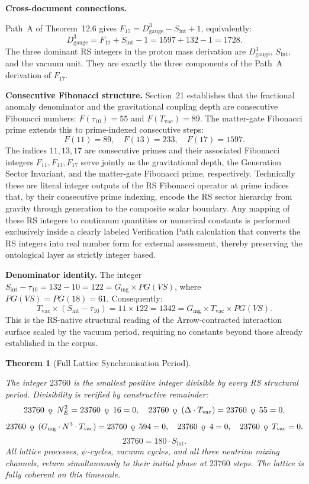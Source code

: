\documentclass[11pt, letterpaper]{article}
\newcommand{\koppa}{\mathbin{\text{\rm\k{o}}}}
\newcommand{\Sint}{S_{\mathrm{int}}}
\theoremstyle{definition}
\theoremstyle{plain}
\newtheorem{theorem}{Theorem}[section]
\begin{document}
\begin{observebox}
\noindent\textbf{Cross-document connections.}

Path~A of Theorem~12.6 gives $F_{17} = D_{\mathrm{gauge}}^3 - S_{\mathrm{int}} + 1$,
equivalently:
\[
D_{\mathrm{gauge}}^3 = F_{17} + S_{\mathrm{int}} - 1 = 1597 + 132 - 1 = 1728.
\]
The three dominant RS integers in the proton mass derivation are
$D_{\mathrm{gauge}}^3$, $S_{\mathrm{int}}$, and the vacuum unit. They are exactly the three
components of the Path~A derivation of $F_{17}$.

\medskip
\noindent\textbf{Consecutive Fibonacci structure.} Section~21 establishes that the
fractional anomaly denominator and the gravitational coupling depth are consecutive
Fibonacci numbers: $F(\tau_{10}) = 55$ and $F(T_{\mathrm{vac}}) = 89$. The matter-gate
Fibonacci prime extends this to prime-indexed consecutive steps:
\[
F(11) = 89, \quad F(13) = 233, \quad F(17) = 1597.
\]
The indices $11, 13, 17$ are consecutive primes and their associated Fibonacci integers $F_{11},F_{13},F_{17}$ serve jointly as the gravitational depth, the Generation Sector Invariant, and the matter-gate Fibonacci prime, respectively. Technically these are literal integer outputs of the RS Fibonacci operator at prime indices that, by their consecutive prime indexing, encode the RS sector hierarchy from gravity through generation to the composite scalar boundary. Any mapping of these RS integers to continuum quantities or numerical constants is performed exclusively inside a clearly labeled Verification Path calculation that converts the RS integers into real number form for external assessment, thereby preserving the ontological layer as strictly integer based.


\medskip
\noindent\textbf{Denominator identity.} The integer
$S_{\mathrm{int}} - \tau_{10} = 132 - 10 = 122 = G_{\mathrm{mg}} \times PG(VS)$,
where $PG(VS) = PG(18) = 61$. Consequently:
\[
T_{\mathrm{vac}} \times (S_{\mathrm{int}} - \tau_{10}) = 11 \times 122 = 1342
= G_{\mathrm{mg}} \times T_{\mathrm{vac}} \times PG(VS).
\]
This is the RS-native structural reading of the Arrow-contracted interaction surface
scaled by the vacuum period, requiring no constants beyond those already established
in the corpus.
\end{observebox}

\begin{theorem}[Full Lattice Synchronisation Period]\label{thm:sync-period}
\begin{rsbox}
The integer $23760$ is the smallest positive integer divisible by every
RS structural period.  Divisibility is verified by constructive remainder:
\[
23760 \;\koppa\; N_E^2 = 23760 \;\koppa\; 16 = 0,\quad
23760 \;\koppa\; (\Delta \cdot T_{\mathrm{vac}}) = 23760 \;\koppa\; 55 = 0,
\]
\[
23760 \;\koppa\; (G_{\mathrm{mg}} \cdot N^3 \cdot T_{\mathrm{vac}}) = 23760 \;\koppa\; 594 = 0,\quad
23760 \;\koppa\; 4 = 0,\quad
23760 \;\koppa\; T_{\mathrm{vac}} = 0.
\]
\[
23760 = 180 \cdot \Sint.
\]
All lattice processes, $\psi$-cycles, vacuum cycles, and all three neutrino
mixing channels, return simultaneously to their initial phase at
$23760$ steps.  The lattice is fully coherent on this timescale.
\end{rsbox}
\end{theorem}
\end{document}

